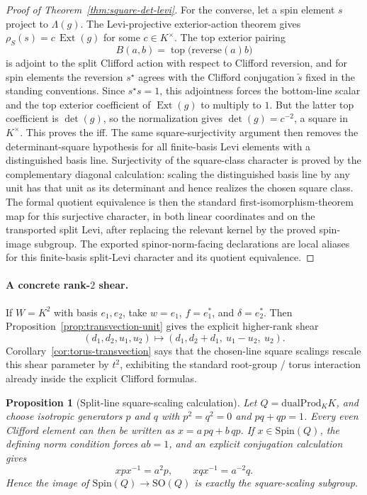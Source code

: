 \documentclass{birkjour}
\theoremstyle{plain}
\newtheorem{proposition}[theorem]{Proposition}
\theoremstyle{definition}
\theoremstyle{remark}
\newcommand{\Spin}{\mathrm{Spin}}
\newcommand{\SO}{\mathrm{SO}}
\newcommand{\dualProd}{\mathrm{dualProd}}
\newcommand{\ExtMap}{\operatorname{Ext}}
\begin{document}
\begin{proof}[Proof of Theorem~\ref{thm:square-det-levi}]
For the converse, let a spin element \(s\) project to \(\Lambda(g)\). The
Levi-projective exterior-action theorem gives
\(\rho_S(s)=c\,\ExtMap(g)\) for some \(c\in K^\times\). The top exterior
pairing
\[
  B(a,b)=\operatorname{top}\bigl(\mathrm{reverse}(a)b\bigr)
\]
is adjoint to the split Clifford action with respect to Clifford reversion, and
for spin elements the reversion \(s^\star\) agrees with the Clifford
conjugation \(\tilde s\) fixed in the standing conventions. Since \(s^\star s=1\),
this adjointness forces the bottom-line scalar and the top exterior coefficient
of \(\ExtMap(g)\) to multiply to \(1\). But the latter top coefficient is
\(\det(g)\), so the normalization gives \(\det(g)=c^{-2}\), a square in
\(K^\times\). This proves the iff. The same square-surjectivity argument then
removes the determinant-square hypothesis for all finite-basis Levi elements
with a distinguished basis line. Surjectivity of the square-class character is
proved by the complementary diagonal calculation: scaling the distinguished
basis line by any unit has that unit as its determinant and hence realizes the
chosen square class. The formal quotient equivalence is then the standard
first-isomorphism-theorem map for this surjective character, in both linear coordinates and on
the transported split Levi, after replacing the relevant kernel by the proved spin-image subgroup.
The exported spinor-norm-facing declarations are local aliases for this
finite-basis split-Levi character and its quotient equivalence.
\end{proof}

\paragraph{A concrete rank-$2$ shear.}
If $W=K^2$ with basis $e_1,e_2$, take $w=e_1$, $f=e_1^*$, and
$\delta=e_2^*$. Then Proposition~\ref{prop:transvection-unit} gives the
explicit higher-rank shear
\[
  (d_1,d_2,u_1,u_2)\longmapsto (d_1,d_2+d_1,\ u_1-u_2,\ u_2).
\]
Corollary~\ref{cor:torus-transvection} says that the chosen-line square
scalings rescale this shear parameter by $t^2$, exhibiting the standard
root-group / torus interaction already inside the explicit Clifford formulas.

\begin{proposition}[Split-line square-scaling calculation]
\label{prop:split-line-square}
Let $Q=\dualProd_K K$, and choose isotropic generators $p$ and $q$ with
\(p^2=q^2=0\) and \(pq+qp=1\). Every even Clifford element can then be written
as \(x=a\,pq+b\,qp\). If \(x\in \Spin(Q)\), the defining norm condition forces
\(ab=1\), and an explicit conjugation calculation gives
\[
  x p x^{-1}=a^2 p,
  \qquad
  x q x^{-1}=a^{-2} q.
\]
Hence the image of $\Spin(Q)\to \SO(Q)$ is exactly the square-scaling subgroup.
\end{proposition}
\end{document}
